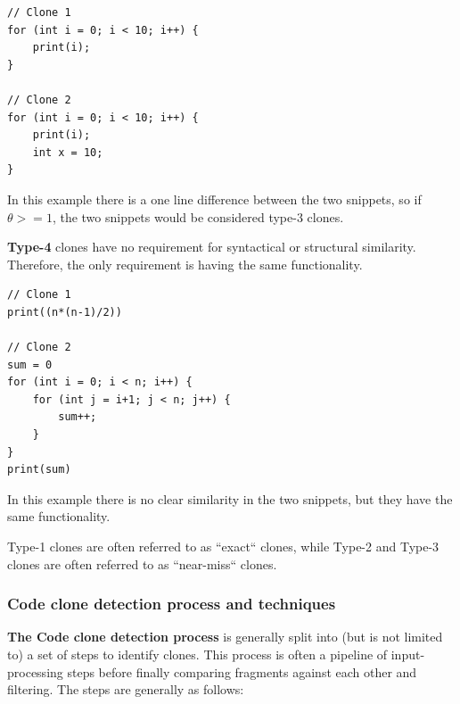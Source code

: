 \documentclass[12pt]{article}
\begin{document}
\begin{lstlisting}
// Clone 1
for (int i = 0; i < 10; i++) {
    print(i);
}

// Clone 2
for (int i = 0; i < 10; i++) {
    print(i);
    int x = 10;
}
\end{lstlisting}

In this example there is a one line difference between the two snippets, so if $\theta >=
1$, the two snippets would be considered type-3 clones.

\textbf{Type-4} clones have no requirement for syntactical or structural similarity. Therefore,
the only requirement is having the same functionality.
\begin{lstlisting}
// Clone 1
print((n*(n-1)/2))

// Clone 2
sum = 0
for (int i = 0; i < n; i++) {
    for (int j = i+1; j < n; j++) {
        sum++;
    }
}
print(sum)
\end{lstlisting}

In this example there is no clear similarity in the two snippets, but they have the same
functionality.

Type-1 clones are often referred to as ``exact`` clones, while Type-2 and Type-3 clones are
often referred to as ``near-miss`` clones\cite[1]{Zibran_real_time_search}.

\subsubsection{Code clone detection process and techniques}

\textbf{The Code clone detection process} is generally split into (but is not limited to)
a set of steps to identify clones\cite{Inoue_introduction_to_cc}. This
process is often a pipeline of input-processing steps before finally comparing fragments
against each other and filtering. The steps are generally as follows:
\end{document}
